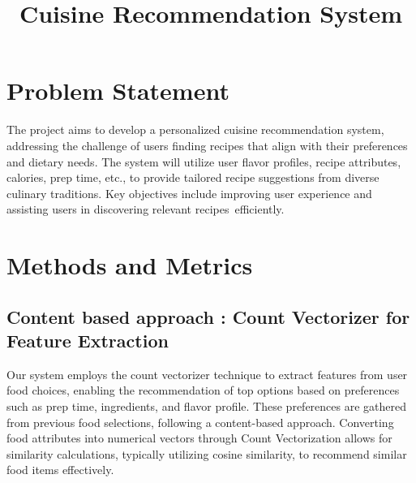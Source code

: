 \documentclass[conference]{IEEEtran}
\begin{document}
\title{Cuisine Recommendation System}

\author{
\and
{}
}

\maketitle

\section{Problem Statement}
The project aims to develop a personalized cuisine recommendation system, addressing the challenge of users finding recipes that align with their preferences and dietary needs. The system will utilize user flavor profiles, recipe attributes, calories, prep time, etc., to provide tailored recipe suggestions from diverse culinary traditions. Key objectives include improving user experience and assisting users in discovering relevant recipes efficiently.
\\
\section{Methods and Metrics}
\subsection{Content based approach : Count Vectorizer for Feature Extraction}

Our system employs the count vectorizer technique to extract features from user food choices, enabling the recommendation of top options based on preferences such as prep time, ingredients, and flavor profile. These preferences are gathered from previous food selections, following a content-based approach. Converting food attributes into numerical vectors through Count Vectorization allows for similarity calculations, typically utilizing cosine similarity, to recommend similar food items effectively.
\\
\end{document}
